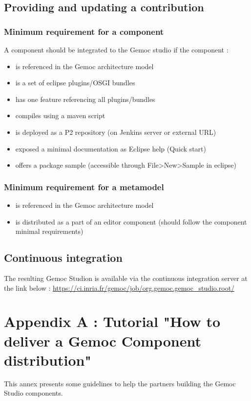 \documentclass{gemoc} %
\begin{document}
\section{Providing and updating a contribution}
\subsection{Minimum requirement for a component}
A component should be integrated to the Gemoc studio if the component :
\begin{itemize}
	\item is referenced in the Gemoc architecture model
	\item is a set of eclipse plugins/OSGI bundles
	\item has one feature referencing all plugins/bundles
	\item compiles using a maven script
	\item is deployed as a P2 repository (on Jenkins server or external URL)
	\item exposed a minimal documentation as Eclipse help (Quick start)
	\item offers a package sample (accessible through File>New>Sample in eclipse)
\end{itemize}
\subsection{Minimum requirement for a metamodel}
\begin{itemize}
	\item is referenced in the Gemoc architecture model
	\item is distributed as a part of an editor component (should follow the component minimal requirements)
\end{itemize}
\section{Continuous integration}
The resulting Gemoc Studion is available via the continuous integration server at the link below :
\newline
\url {https://ci.inria.fr/gemoc/job/org.gemoc.gemoc_studio.root/}

\newpage
\chapter{Appendix A : Tutorial "How to deliver a Gemoc Component distribution"}
This annex presents some guidelines to help the partners building the Gemoc Studio components.
\end{document}
